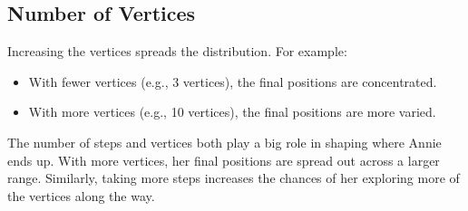 \documentclass[11pt, a4paper]{amsart}
\begin{document}
\subsection{Number of Vertices}
Increasing the vertices spreads the distribution.
For example:
\begin{itemize}
    \item With fewer vertices (e.g., 3 vertices), the final positions are concentrated.
    \item With more vertices (e.g., 10 vertices), the final positions are more varied.
\end{itemize}

The number of steps and vertices both play a big role in shaping where Annie ends up. With more vertices, her final positions are spread out across a larger range. Similarly, taking more steps increases the chances of her exploring more of the vertices along the way.
\end{document}
